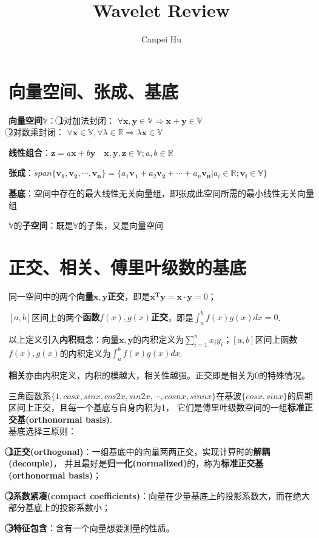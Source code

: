 \documentclass{article}
\begin{document}
\begin{CJK}{UTF8}{gbsn}
	\author{Canpei Hu}
	\title{Wavelet Review}
	\maketitle
\setlength{\parindent}{2em}


\section{向量空间、张成、基底}
	\textbf{向量空间}$\mathbb{V}$：
	\textcircled{1}对加法封闭：
		$\forall\boldsymbol{x},\boldsymbol{y}\in\mathbb{V}\Rightarrow \boldsymbol{x}+\boldsymbol{y}\in\mathbb{V}$
\\
	\indent\indent\indent\indent\textcircled{2}对数乘封闭：
		$\forall\boldsymbol{x}\in\mathbb{V},\forall\lambda\in\mathbb{R}\Rightarrow\lambda\boldsymbol{x}\in\mathbb{V}$\par
	\textbf{线性组合}：$\boldsymbol{z}=a\boldsymbol{x}+b\boldsymbol{y}\quad\boldsymbol{x},\boldsymbol{y},\boldsymbol{z}\in\mathbb{V};a,b\in\mathbb{R}$\par
	\textbf{张成}：$span\{\boldsymbol{v_1},\boldsymbol{v_2},\cdots,\boldsymbol{v_n}\}=
		\{a_1\boldsymbol{v_1}+a_2\boldsymbol{v_2}+\cdots+a_n\boldsymbol{v_n}|a_i\in\mathbb{R};\boldsymbol{v_i}\in\mathbb{V}\}$\par
	\textbf{基底}：空间中存在的最大线性无关向量组，即张成此空间所需的最小线性无关向量组\par
	$\mathbb{V}$的\textbf{子空间}：既是$\mathbb{V}$的子集，又是向量空间\\

\section{正交、相关、傅里叶级数的基底}
	同一空间中的两个\textbf{向量$\boldsymbol{x},\boldsymbol{y}$正交}，即是$\boldsymbol{x^T}\boldsymbol{y}=\boldsymbol{x}\cdot\boldsymbol{y}=0$；\par
	$[a,b]$区间上的两个\textbf{函数$f(x),g(x)$正交}，即是$\int_a^bf(x)g(x)dx=0$.\par
	以上定义引入\textbf{内积}概念：向量$\boldsymbol{x},\boldsymbol{y}$的内积定义为$\sum_{i=1}^nx_iy_i$；$[a,b]$区间上函数$f(x),g(x)$的内积定义为$\int_a^bf(x)g(x)dx$.\par
	\textbf{相关}亦由内积定义，内积的模越大，相关性越强。正交即是相关为0的特殊情况。\par
	三角函数系$\{1,cosx,sinx,cos2x,sin2x,\cdots,cosnx,sinnx\}$在基波$\{cosx,sinx\}$的周期区间上正交，且每一个基底与自身内积为1，
	它们是傅里叶级数空间的一组\textbf{标准正交基(orthonormal basis)}.\\
	基底选择三原则：\par
	\textbf{\textcircled{1}正交(orthogonal)}：一组基底中的向量两两正交，实现计算时的\textbf{解耦(decouple)}，
	并且最好是\textbf{归一化(normalized)}的，称为\textbf{标准正交基(orthonormal basis)}；\par
	\textbf{\textcircled{2}系数紧凑(compact coefficients)}：向量在少量基底上的投影系数大，而在绝大部分基底上的投影系数小；\par
	\textbf{\textcircled{3}特征包含}：含有一个向量想要测量的性质。\\


\end{CJK}
\end{document}
